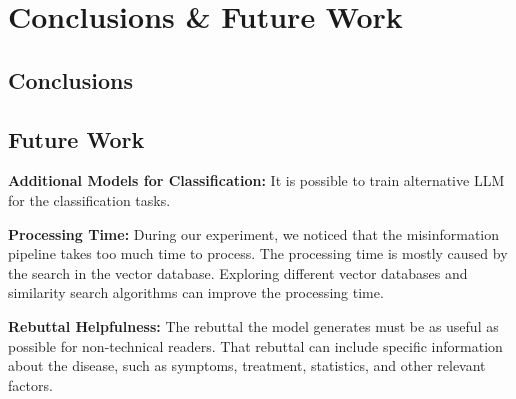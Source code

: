 



\chapter{Conclusions \& Future Work}  

\section{Conclusions}


\section{Future Work}

\begin{description}

\item{\textbf{Additional Models for Classification:}} It is possible to train alternative LLM  for the classification tasks.

\item{\textbf{Processing Time:}} During our experiment, we noticed that the misinformation pipeline takes too much time to process. The processing time is mostly caused by the search in the vector database. Exploring different vector databases and similarity search algorithms can improve the processing time.

\item{\textbf{Rebuttal Helpfulness:}} The rebuttal the model generates must be as useful as possible for non-technical readers. That rebuttal can include specific information about the disease, such as symptoms, treatment, statistics, and other relevant factors.

\end{description}
